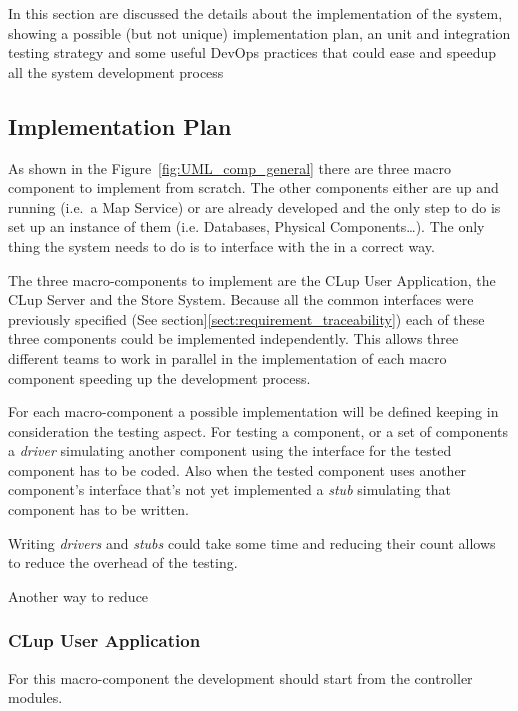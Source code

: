 In this section are discussed the details about the implementation of the system, showing a possible (but not unique) implementation plan, an unit and integration testing strategy and some useful DevOps practices that could ease and speedup all the system development process


\subsection{Implementation Plan}
As shown in the Figure~\ref{fig:UML_comp_general} there are three macro component to implement from scratch. The other components either are up and running (i.e.~a Map Service) or are already developed and the only step to do is set up an instance of them (i.e. Databases, Physical Components\ldots). 
The only thing the system needs to do is to interface with the in a correct way.

The three macro-components to implement are the CLup User Application, the CLup Server and the Store System. Because all the common interfaces were previously specified (See section]\ref{sect:requirement_traceability}) each of these three components could be implemented independently. This allows three different teams to work in parallel in the implementation of each macro component speeding up the development process.

For each macro-component a possible implementation will be defined keeping in consideration the testing aspect. For testing a component, or a set of components a \textit{driver} simulating another component using the interface for the tested component has to be coded. Also when the tested component uses another component's interface that's not yet implemented a \textit{stub} simulating that component has to be written. 

Writing \textit{drivers} and \textit{stubs} could take some time and reducing their count allows to reduce the overhead of the testing.

Another way to reduce 

\subsubsection{CLup User Application}
For this macro-component the development should start from the controller modules. 